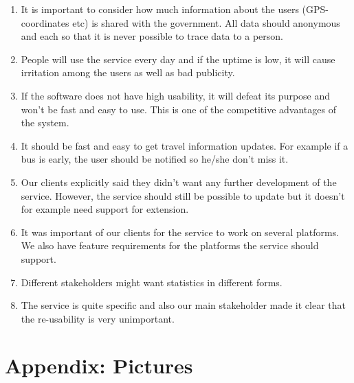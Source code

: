 \documentclass[a4paper]{article}
\begin{document}
		\begin{enumerate}
  			\item It is important to consider how much information about the users (GPS-coordinates etc) is shared with the government.	All data should anonymous and each so that it is never possible to trace data to a person.
  			\item People will use the service every day and if the uptime is low, it will cause irritation among the users as well as bad publicity.
  			\item If the software does not have high usability, it will defeat its purpose and won't be fast and easy to use. This is one of the competitive advantages of the system.
  			\item It should be fast and easy to get travel information updates. For example if a bus is early, the user should be notified so he/she don't miss it.
  			\item Our clients explicitly said they didn't want any further development of the service. However, the service should still be possible to update but it doesn't for example need support for extension.
  			\item It was important of our clients for the service to work on several platforms. We also have feature requirements for the platforms the service should support.
  			\item Different stakeholders might want statistics in different forms.
  			\item The service is quite specific and also our main stakeholder made it clear that the re-usability is very unimportant.	
		\end{enumerate}

			
		
	\section{Appendix: Pictures} %
		\label{sec:appendix}
		
\end{document}
